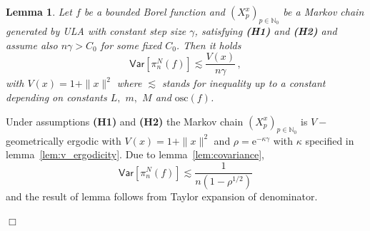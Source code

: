 \documentclass[bj]{imsart}
\def\PVar{\mathsf{Var}}
\def\nset{\mathbb{N}}
\def\rme{\mathrm{e}}
\newcommand{\proofendsign}{$\Box$}
\newtheorem{lem}[thm]{Lemma}
\newenvironment{proof}{{\noindent \bf Proof }}
 {{\hspace*{\fill}\proofendsign\par\bigskip}}
\def\eqsp{\,}
\begin{document}
\begin{lem} 
\label{lem:variance}
Let $f$ be a bounded Borel function and $(X^x_{p})_{p \in \nset_0}$ be a Markov chain generated by ULA with constant step size $\gamma$, satisfying {\bf (H1)} and {\bf (H2)} and assume also $n\gamma > C_0$ for some fixed $C_0$. Then it holds
\begin{equation}
\label{eq:var-mc}
\PVar[\pi_n^N(f)]\lesssim \frac{V(x)}{n\gamma} \eqsp,
\end{equation}
with $V(x) = 1+ \|x\|^2$ where $\lesssim$ stands for inequality up to a constant depending on constants $L,$ $m,$  $M$ and $\mathrm{osc}(f)$.
\end{lem}
\begin{proof}
Under assumptions {\bf (H1)} and {\bf (H2)} the Markov chain $(X^x_{p})_{p \in \nset_0}$ is $V-$geometrically ergodic with $V(x) = 1+\|x\|^2$ and $\rho = \rme^{-\kappa\gamma}$ with $\kappa$ specified in lemma~\ref{lem:v_ergodicity}. Due to lemma~\ref{lem:covariance}, 
\[
\PVar[\pi_n^N(f)]\lesssim \frac{1}{n(1-\rho^{1/2})}
\]
and the result of lemma follows from Taylor expansion of denominator.
\end{proof}
\end{document}
